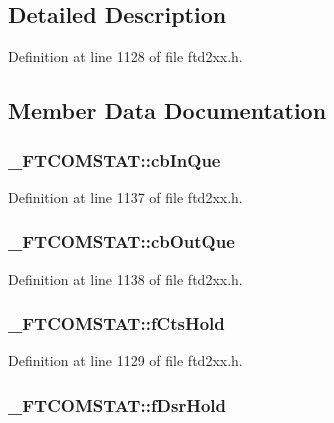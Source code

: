 \subsection{Detailed Description}


Definition at line 1128 of file ftd2xx.h.

\subsection{Member Data Documentation}
\hypertarget{struct__FTCOMSTAT_a995717c2425e3e52f046565bb60fbb3d}{
\subsubsection[{cbInQue}]{ {\bf \_\-FTCOMSTAT::cbInQue}}}
\label{struct__FTCOMSTAT_a995717c2425e3e52f046565bb60fbb3d}


Definition at line 1137 of file ftd2xx.h.\hypertarget{struct__FTCOMSTAT_ab0fbaa7889620e204d2f583b6e31f848}{
\subsubsection[{cbOutQue}]{ {\bf \_\-FTCOMSTAT::cbOutQue}}}
\label{struct__FTCOMSTAT_ab0fbaa7889620e204d2f583b6e31f848}


Definition at line 1138 of file ftd2xx.h.\hypertarget{struct__FTCOMSTAT_ad78060ad831dfa35a9e2db1103a54c3f}{
\subsubsection[{fCtsHold}]{ {\bf \_\-FTCOMSTAT::fCtsHold}}}
\label{struct__FTCOMSTAT_ad78060ad831dfa35a9e2db1103a54c3f}


Definition at line 1129 of file ftd2xx.h.\hypertarget{struct__FTCOMSTAT_a63c6ff1a00dd690b0bf9347c949a59c8}{
\subsubsection[{fDsrHold}]{ {\bf \_\-FTCOMSTAT::fDsrHold}}}
\label{struct__FTCOMSTAT_a63c6ff1a00dd690b0bf9347c949a59c8}


